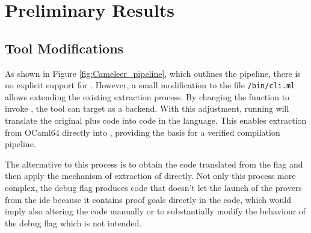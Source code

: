 
%

\chapter{Preliminary Results}
\label{cha:Preliminary_Results}



\section{Tool Modifications}

As shown in Figure \ref{fig:Cameleer_pipeline}, which outlines the \cameleer pipeline, there is no explicit support for \cml. 
However, a small modification to the file \texttt{/bin/cli.ml} allows extending the existing extraction process. By changing the 
 function to invoke , 
the tool can target \cml as a backend. With this adjustment, running  will translate 
the original \ocaml plus \gospel code into code in the \cml language. This enables extraction from \textsf{OCaml64} directly 
into \cml, providing the basis for a verified compilation pipeline.

The alternative to this process is to obtain the code translated \whyml from the flag  and then apply the 
mechanism of extraction of \whythree directly. Not only this process more complex, the debug flag produces code that doesn't 
let the launch of the provers from the \whythree ide because it contains proof goals directly in the code, which would imply 
also altering the code manually or to substantially modify the behaviour of the debug flag which is not intended.

